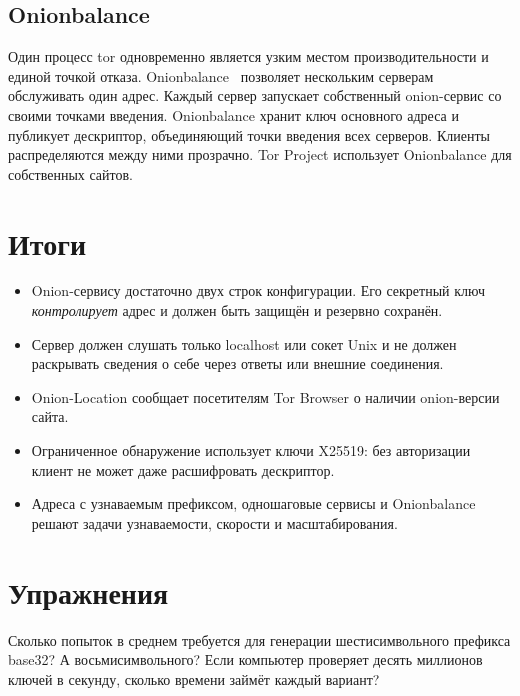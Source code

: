\subsection{Onionbalance}

Один процесс tor одновременно является узким местом производительности и единой точкой отказа. Onionbalance~\cite{onionbalance} позволяет нескольким серверам обслуживать один адрес. Каждый сервер запускает собственный onion-сервис со своими точками введения. Onionbalance хранит ключ основного адреса и публикует дескриптор, объединяющий точки введения всех серверов. Клиенты распределяются между ними прозрачно. Tor Project использует Onionbalance для собственных сайтов.

\section*{Итоги}
\begin{itemize}
  \item Onion-сервису достаточно двух строк конфигурации. Его секретный ключ \emph{контролирует} адрес и должен быть защищён и резервно сохранён.
  \item Сервер должен слушать только localhost или сокет Unix и не должен раскрывать сведения о себе через ответы или внешние соединения.
  \item Onion-Location сообщает посетителям Tor Browser о наличии onion-версии сайта.
  \item Ограниченное обнаружение использует ключи X25519: без авторизации клиент не может даже расшифровать дескриптор.
  \item Адреса с узнаваемым префиксом, одношаговые сервисы и Onionbalance решают задачи узнаваемости, скорости и масштабирования.
\end{itemize}

\section*{Упражнения}

\begin{esercizio}[1]\label{es:21-vanity}
Сколько попыток в среднем требуется для генерации шестисимвольного префикса base32? А восьмисимвольного? Если компьютер проверяет десять миллионов ключей в секунду, сколько времени займёт каждый вариант?
\end{esercizio}

